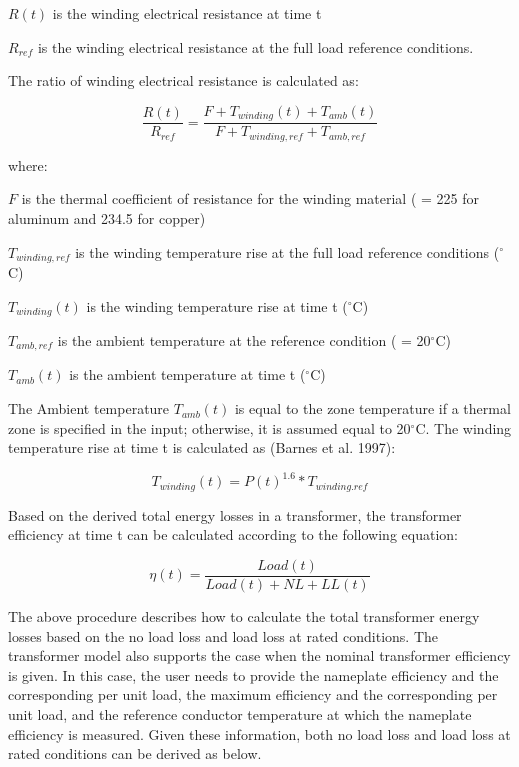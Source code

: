 \(R(t)\) is the winding electrical resistance at time t

\({R_{ref}}\) is the winding electrical resistance at the full load reference conditions.

The ratio of winding electrical resistance is calculated as:

\begin{equation}
\frac{{R(t)}}{{{R_{ref}}}} = \frac{{F + {T_{winding}}(t) + {T_{amb}}(t)}}{{F + {T_{winding,ref}} + {T_{amb,ref}}}}
\end{equation}

where:

\(F\) is the thermal coefficient of resistance for the winding material ( = 225 for aluminum and 234.5 for copper)

\({T_{winding,ref}}\) is the winding temperature rise at the full load reference conditions (\(^{\circ}\)C)

\({T_{winding}}(t)\) is the winding temperature rise at time t (\(^{\circ}\)C)

\({T_{amb,ref}}\) is the ambient temperature at the reference condition ( = 20\(^{\circ}\)C)

\({T_{amb}}(t)\) is the ambient temperature at time t (\(^{\circ}\)C)

The Ambient temperature \({T_{amb}}(t)\) is equal to the zone temperature if a thermal zone is specified in the input; otherwise, it is assumed equal to 20\(^{\circ}\)C. The winding temperature rise at time t is calculated as (Barnes et al. 1997):

\begin{equation}
{T_{winding}}(t) = P{(t)^{1.6}}*{T_{winding.ref}}
\end{equation}

Based on the derived total energy losses in a transformer, the transformer efficiency at time t can be calculated according to the following equation:

\begin{equation}
\eta (t) = \frac{{Load(t)}}{{Load(t) + NL + LL(t)}}
\end{equation}

The above procedure describes how to calculate the total transformer energy losses based on the no load loss and load loss at rated conditions. The transformer model also supports the case when the nominal transformer efficiency is given. In this case, the user needs to provide the nameplate efficiency and the corresponding per unit load, the maximum efficiency and the corresponding per unit load, and the reference conductor temperature at which the nameplate efficiency is measured. Given these information, both no load loss and load loss at rated conditions can be derived as below.

